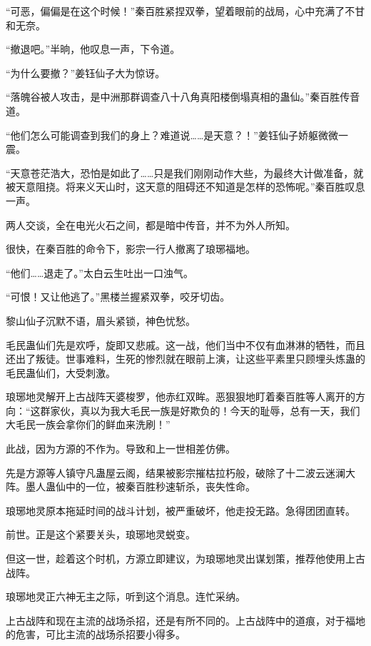 
\begin{this_body}

“可恶，偏偏是在这个时候！”秦百胜紧捏双拳，望着眼前的战局，心中充满了不甘和无奈。

“撤退吧。”半晌，他叹息一声，下令道。

“为什么要撤？”姜钰仙子大为惊讶。

“落魄谷被人攻击，是中洲那群调查八十八角真阳楼倒塌真相的蛊仙。”秦百胜传音道。

“他们怎么可能调查到我们的身上？难道说……是天意？！”姜钰仙子娇躯微微一震。

“天意苍茫浩大，恐怕是如此了……只是我们刚刚动作大些，为最终大计做准备，就被天意阻挠。将来义天山时，这天意的阻碍还不知道是怎样的恐怖呢。”秦百胜叹息一声。

两人交谈，全在电光火石之间，都是暗中传音，并不为外人所知。

很快，在秦百胜的命令下，影宗一行人撤离了琅琊福地。

“他们……退走了。”太白云生吐出一口浊气。

“可恨！又让他逃了。”黑楼兰握紧双拳，咬牙切齿。

黎山仙子沉默不语，眉头紧锁，神色忧愁。

毛民蛊仙们先是欢呼，旋即又悲戚。这一战，他们当中不仅有血淋淋的牺牲，而且还出了叛徒。世事难料，生死的惨烈就在眼前上演，让这些平素里只顾埋头炼蛊的毛民蛊仙们，大受刺激。

琅琊地灵解开上古战阵天婆梭罗，他赤红双眸。恶狠狠地盯着秦百胜等人离开的方向：“这群家伙，真以为我大毛民一族是好欺负的！今天的耻辱，总有一天，我们大毛民一族会拿你们的鲜血来洗刷！”

此战，因为方源的不作为。导致和上一世相差仿佛。

先是方源等人镇守凡蛊屋云阁，结果被影宗摧枯拉朽般，破除了十二波云迷澜大阵。墨人蛊仙中的一位，被秦百胜秒速斩杀，丧失性命。

琅琊地灵原本拖延时间的战斗计划，被严重破坏，他走投无路。急得团团直转。

前世。正是这个紧要关头，琅琊地灵蜕变。

但这一世，趁着这个时机，方源立即建议，为琅琊地灵出谋划策，推荐他使用上古战阵。

琅琊地灵正六神无主之际，听到这个消息。连忙采纳。

上古战阵和现在主流的战场杀招，还是有所不同的。上古战阵中的道痕，对于福地的危害，可比主流的战场杀招要小得多。


\end{this_body}
